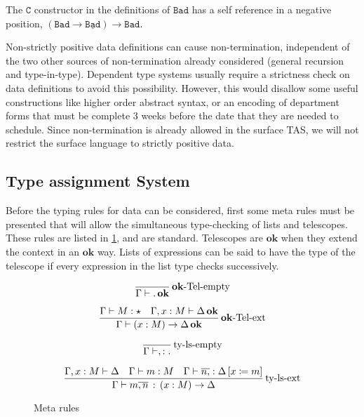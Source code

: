 The $\mathtt{C}$ constructor in the definitions of $\mathtt{Bad}$ has a self reference in a negative position, $(\mathtt{Bad}\rightarrow\underline{\mathtt{Bad}})\rightarrow\mathtt{Bad}$. 

Non-strictly positive data definitions can cause non-termination, independent of the two other sources of non-termination already considered (general recursion and type-in-type).
Dependent type systems usually require a strictness check on data definitions to avoid this possibility.
However, this would disallow some useful constructions like higher order abstract syntax, or an encoding of department forms that must be complete 3 weeks before the date that they are needed to schedule.
Since non-termination is already allowed in the surface \ac{TAS}, we will not restrict the surface language to strictly positive data.



\subsection{Type assignment System}

Before the typing rules for data can be considered, first some meta rules must be presented that will allow the simultaneous type-checking of lists and telescopes.
These rules are listed in \ref{fig:surface-data-meta-ty}, and are standard.
Telescopes are $\mathbf{ok}$ when they extend the context in an $\mathbf{ok}$ way.
Lists of expressions can be said to have the type of the telescope if every expression in the list type checks successively.

\begin{figure}
\[
\frac{
  \,
  }{\Gamma\vdash.\,\mathbf{ok}}\operatorname{\mathbf{ok}-Tel-empty}
\]

\[
\frac{
  \Gamma\vdash M:\star\quad\Gamma,x:M\vdash\Delta\,\mathbf{ok}
  }{\Gamma\vdash\left(x:M\right)\rightarrow\Delta\,\mathbf{ok}}\operatorname{\mathbf{ok}-Tel-ext}
\]

\[
\frac{
  \,
}{\Gamma\vdash,:.}\operatorname{ty-ls-empty}
\]

\[
\frac{
  \Gamma,x:M\vdash\Delta\quad\Gamma\vdash m:M\quad\Gamma\vdash\overline{n,} %
  :\Delta\left[x\coloneqq m\right]
  }{\Gamma\vdash m\overline{,n}\,:\,\left(x:M\right)\rightarrow\Delta}\rulename{ty-ls-ext}
\]

\caption{Meta rules}
\label{fig:surface-data-meta-ty}
\end{figure}

